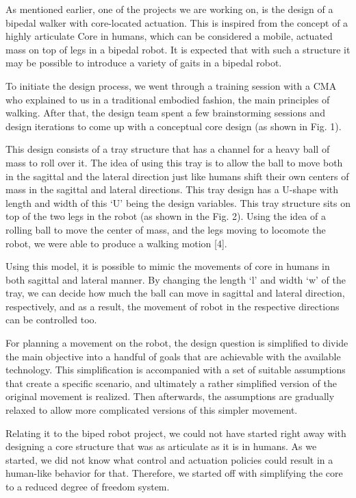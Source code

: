 \documentclass[arts,article,submit,moreauthors,pdftex,10pt,a4paper]{mdpi}
\begin{document}
As mentioned earlier, one of the projects we are working on, is the design of a bipedal walker with core-located actuation. This is inspired from the concept of a highly articulate Core in humans, which can be considered a mobile, actuated mass on top of legs in a bipedal robot. It is expected that with such a structure it may be possible to introduce a variety of gaits in a bipedal robot. 

To initiate the design process, we went through a training session with a CMA who explained to us in a traditional embodied fashion, the main principles of walking. After that, the design team spent a few brainstorming sessions and design iterations to come up with a conceptual core design (as shown in Fig. 1). 

This design consists of a tray structure that has a channel for a heavy ball of mass to roll over it. The idea of using this tray is to allow the ball to move both in the sagittal and the lateral direction just like humans shift their own centers of mass in the sagittal and lateral directions. This tray design has a U-shape with length and width of this ‘U’ being the design variables. This tray structure sits on top of the two legs in the robot (as shown in the Fig. 2). Using the idea of a rolling ball to move the center of mass, and the legs moving to locomote the robot, we were able to produce a walking motion [4].

Using this model, it is possible to mimic the movements of core in humans in both sagittal and lateral manner. By changing the length ‘l’ and width ‘w’ of the tray, we can decide how much the ball can move in sagittal and lateral direction, respectively, and as a result, the movement of robot in the respective directions can be controlled too.

For planning a movement on the robot, the design question is simplified to divide the main objective into a handful of goals that are achievable with the available technology. This simplification is accompanied with a set of suitable assumptions that create a specific scenario, and ultimately a rather simplified version of the original movement is realized. Then afterwards, the assumptions are gradually relaxed to allow more complicated versions of this simpler movement. 

Relating it to the biped robot project, we could not have started right away with designing a core structure that was as articulate as it is in humans. As we started, we did not know what control and actuation policies could result in a human-like behavior for that. Therefore, we started off with simplifying the core to a reduced degree of freedom system. 
\end{document}
